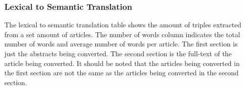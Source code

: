 \documentclass[12pt]{article}
\begin{document}
	\subsubsection{Lexical to Semantic Translation}
	The lexical to semantic translation table shows the amount of triples extracted from a set amount of articles. The number of words column indicates the total number of words and average number of words per article. The first section is just the abstracts being converted. The second section is the full-text of the article being converted. It should be noted that the articles being converted in the first section are not the same as the articles being converted in the second section.
	
\end{document}
